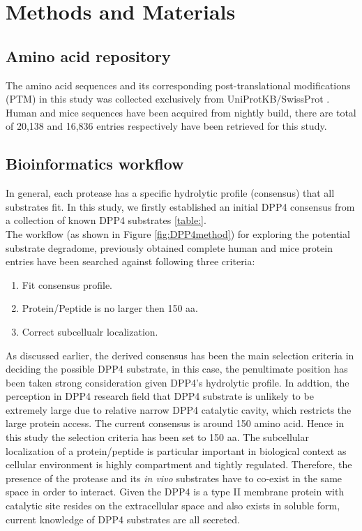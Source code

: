 \section{Methods and Materials}

\subsection{Amino acid repository}
The amino acid sequences and its corresponding post-translational modifications (PTM) in this study was collected exclusively from UniProtKB/SwissProt \cite{Magrane:2011fv}. Human and mice sequences have been acquired from nightly build, there are total of 20,138 and 16,836 entries respectively have been retrieved for this study. 
\\
\subsection{Bioinformatics workflow}
In general, each protease has a specific hydrolytic profile (consensus) that all substrates fit. In this study, we firstly established an initial DPP4 consensus from a collection of known DPP4 substrates \ref{table:}. 
\\
The workflow (as shown in Figure \ref{fig:DPP4method}) for exploring the potential substrate degradome, previously obtained complete human and mice protein entries have been searched against following three criteria:
\begin{enumerate}
\item Fit consensus profile.
\item Protein/Peptide is no larger then 150 aa. 
\item Correct subcellualr localization.
\end{enumerate}

As discussed earlier, the derived consensus has been the main selection criteria in deciding the possible DPP4 substrate, in this case, the penultimate position has been taken strong consideration given DPP4's hydrolytic profile. In addtion, the perception in DPP4 research field that DPP4 substrate is unlikely to be extremely large due to relative narrow DPP4 catalytic cavity, which restricts the large protein access. The current consensus is around 150 amino acid. Hence in this study the selection criteria has been set to 150 aa. The subcellular localization of a protein/peptide is particular important in biological context as cellular environment is highly compartment and tightly regulated. Therefore, the presence of the protease and its \textit{in vivo} substrates have to co-exist in the same space in order to interact. Given the DPP4 is a type II membrane protein with catalytic site resides on the extracellular space and also exists in soluble form, current knowledge of DPP4 substrates are all secreted. 
\\

